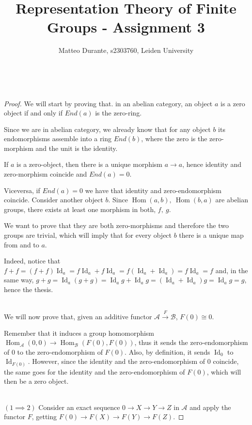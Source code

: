 \documentclass{article}
\newcommand{\exercise}[1]{\noindent {\bf Exercise #1}}
\DeclareMathOperator{\Id}{Id}
\DeclareMathOperator{\Hom}{Hom}
\begin{document}
\title{Representation Theory of Finite Groups - Assignment 3}

\author{Matteo Durante, s2303760, Leiden University}

\maketitle


~\\
\exercise{5.7}

\begin{proof}
	We will start by proving that. in an abelian category, an object $a$ is a zero object if and only if $End(a)$ is the zero-ring.
	
	Since we are in abelian category, we already know that for any object $b$ its endomorphisms assemble into a ring $End(b)$, where the zero is the zero-morphism and the unit is the identity.
	
	If $a$ is a zero-object, then there is a unique morphism $a\rightarrow a$, hence identity and zero-morphism coincide and $End(a)=0$.
	
	Viceversa, if $End(a)=0$ we have that identity and zero-endomorphism coincide. Consider another object $b$. Since $\Hom(a,b),\ \Hom(b,a)$ are abelian groups, there exists at least one morphism in both, $f,\ g$.
	
	We want to prove that they are both zero-morphisms and therefore the two groups are trivial, which will imply that for every object $b$ there is a unique map from and to $a$.
	
	Indeed, notice that $f+f=(f+f)\Id_a=f\Id_a+f\Id_a=f(\Id_a+\Id_a)=f\Id_a=f$ and, in the same way, $g+g=\Id_a(g+g)=\Id_ag+\Id_ag=(\Id_a+\Id_a)g=\Id_ag=g$, hence the thesis.
	
	~\\
	We will now prove that, given an additive functor $\mathcal{A}\xrightarrow{F}\mathcal{B}$, $F(0)\cong 0$.
	
	Remember that it induces a group homomorphism $\Hom_{\mathcal{A}}(0,0)\rightarrow \Hom_{\mathcal{B}}(F(0),F(0))$, thus it sends the zero-endomorphism of 0 to the zero-endomorphism of $F(0)$. Also, by definition, it sends $\Id_0$ to $\Id_{F(0)}$. However, since the identity and the zero-endomorphism of 0 coincide, the same goes for the identity and the zero-endomorphism of $F(0)$, which will then be a zero object.
	
	~\\
	
	$(1\implies 2)$ Consider an exact sequence $0\rightarrow X\rightarrow Y\rightarrow Z$ in $\mathcal{A}$ and apply the functor $F$, getting $F(0)\rightarrow F(X)\rightarrow F(Y)\rightarrow F(Z)$.
	

\end{proof}
\end{document}
